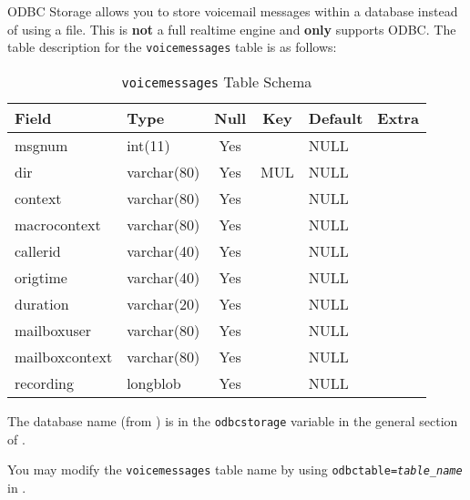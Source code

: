 

ODBC Storage allows you to store voicemail messages within a database 
instead of using a file.  This is \textbf{not} a full realtime engine and 
\textbf{only} supports ODBC.  The table description for the \texttt{voicemessages}
table is as follows:

\begin{table}[h]
\begin{center}
\begin{tabular}{ | l | l | c | c | l | l | }
\hline
Field          & Type        & Null & Key & Default & Extra \\ \hline \hline
msgnum         & int(11)     & Yes  &     & NULL    &       \\ \hline
dir            & varchar(80) & Yes  & MUL & NULL    &       \\ \hline
context        & varchar(80) & Yes  &     & NULL    &       \\ \hline
macrocontext   & varchar(80) & Yes  &     & NULL    &       \\ \hline
callerid       & varchar(40) & Yes  &     & NULL    &       \\ \hline
origtime       & varchar(40) & Yes  &     & NULL    &       \\ \hline
duration       & varchar(20) & Yes  &     & NULL    &       \\ \hline
mailboxuser    & varchar(80) & Yes  &     & NULL    &       \\ \hline
mailboxcontext & varchar(80) & Yes  &     & NULL    &       \\ \hline
recording      & longblob    & Yes  &     & NULL    &       \\
\hline
\end{tabular}
\end{center}
\caption{\texttt{voicemessages} Table Schema}
\end{table}

The database name (from ) is in the
\texttt{odbcstorage} variable in the general section of .

You may modify the \texttt{voicemessages} table name by using
\texttt{odbctable=\textit{table\_name}} in .
